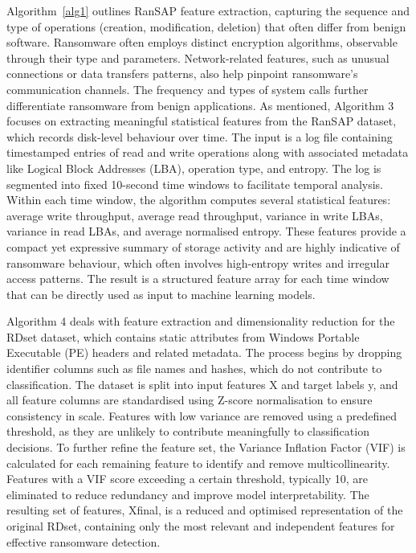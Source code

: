 Algorithm~\ref{alg1}  outlines RanSAP feature extraction, capturing the sequence and type of operations (creation, modification, deletion)  that often differ from benign software. Ransomware  often employs  distinct encryption algorithms, observable through their type and parameters. Network-related features, such as unusual connections or data transfers patterns, also help  pinpoint ransomware’s communication channels. The frequency and types of system calls further differentiate ransomware from benign applications. As mentioned, Algorithm 3 focuses on extracting meaningful statistical features from the RanSAP dataset, which records disk-level behaviour over time. The input is a log file containing timestamped entries of read and write operations along with associated metadata like Logical Block Addresses (LBA), operation type, and entropy. The log is segmented into fixed 10-second time windows to facilitate temporal analysis. Within each time window, the algorithm computes several statistical features: average write throughput, average read throughput, variance in write LBAs, variance in read LBAs, and average normalised entropy. These features provide a compact yet expressive summary of storage activity and are highly indicative of ransomware behaviour, which often involves high-entropy writes and irregular access patterns. The result is a structured feature array for each time window that can be directly used as input to machine learning models.

Algorithm 4 deals with feature extraction and dimensionality reduction for the RDset dataset, which contains static attributes from Windows Portable Executable (PE) headers and related metadata. The process begins by dropping identifier columns such as file names and hashes, which do not contribute to classification. The dataset is split into input features X and target labels y, and all feature columns are standardised using Z-score normalisation to ensure consistency in scale. Features with low variance are removed using a predefined threshold, as they are unlikely to contribute meaningfully to classification decisions. To further refine the feature set, the Variance Inflation Factor (VIF) is calculated for each remaining feature to identify and remove multicollinearity. Features with a VIF score exceeding a certain threshold, typically 10, are eliminated to reduce redundancy and improve model interpretability. The resulting set of features, Xfinal, is a reduced and optimised representation of the original RDset, containing only the most relevant and independent features for effective ransomware detection.

